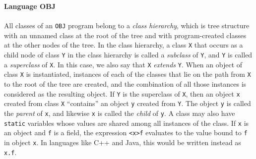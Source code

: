 \begin{minipage}[t]{\sw}
\slidenumber
\LARGE
{\bf Language OBJ}\\
\vspace{-1ex}\\
All classes of an \verb'OBJ' program belong to a {\em class hierarchy},
which is tree structure with an unnamed class at the root of the tree
and with program-created classes at the other nodes of the tree.\exx
In the class hierarchy,
a class \verb'X' that occurs as a child node of class \verb'Y'
in the class hierarchy
is called a {\em subclass} of \verb'Y',
and \verb'Y' is called a {\em superclass} of \verb'X'.
In this case, we also say that \verb'X' {\em extends} \verb'Y'.\exx
When an object of class \verb'X' is instantiated,
instances of each of the classes that lie
on the path from \verb'X' to the root of the tree
are created, and the combination of all those instances
is considered as the resulting object.\exx
If \verb'Y' is the superclass of \verb'X',
then an object \verb'x' created from class \verb'X' ``contains''
an object \verb'y' created from \verb'Y'.
The object \verb'y' is called the {\em parent} of \verb'x',
and likewise \verb'x' is called the {\em child} of \verb'y'.\exx
A class may also have \verb'static' variables
whose values are shared among all instances of the class.\exx
If \verb'x' is an object and \verb'f' is a field,
the expression \verb'<x>f' evaluates to the value bound to \verb'f'
in object \verb'x'.
In languages like C++ and Java,
this would be written instead as \verb'x.f'.
\end{minipage}
